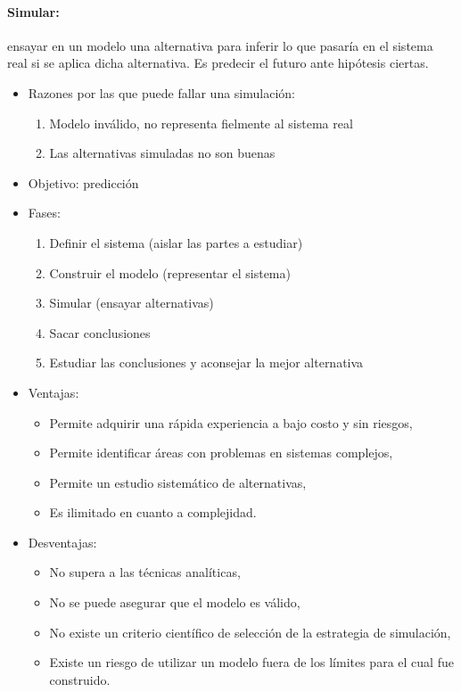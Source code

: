 \documentclass[12pt, a4paper, twoside]{paquetes-apunte/apunte}
\begin{document}
\paragraph{Simular:} ensayar en un modelo una alternativa para inferir lo que
pasaría en el sistema real si se aplica dicha alternativa.
Es predecir el futuro ante hipótesis ciertas.

\begin{itemize}
  \item Razones por las que puede fallar una simulación:
  \begin{enumerate}
    \item Modelo inválido, no representa fielmente al sistema real
    \item Las alternativas simuladas no son buenas
  \end{enumerate}

  \item Objetivo: predicción

  \item Fases:
  \begin{enumerate}
    \item Definir el sistema (aislar las partes a estudiar)
    \item Construir el modelo (representar el sistema)
    \item Simular (ensayar alternativas)
    \item Sacar conclusiones
    \item Estudiar las conclusiones y aconsejar la mejor alternativa
  \end{enumerate}

  \item Ventajas:
  \begin{itemize}
    \item Permite adquirir una rápida experiencia a bajo costo y sin riesgos,
    \item Permite identificar áreas con problemas en sistemas complejos,
    \item Permite un estudio sistemático de alternativas,
    \item Es ilimitado en cuanto a complejidad.
  \end{itemize}

  \item Desventajas:
  \begin{itemize}
    \item No supera a las técnicas analíticas,
    \item No se puede asegurar que el modelo es válido,
    \item No existe un criterio científico de selección de la estrategia de
      simulación,
    \item Existe un riesgo de utilizar un modelo fuera de los límites para el
      cual fue construido.
  \end{itemize}
\end{itemize}
\end{document}
